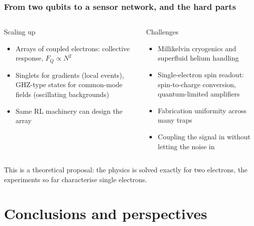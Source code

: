 \documentclass{beamer}
\begin{document}
\begin{frame}
\frametitle{From two qubits to a sensor network, and the hard parts}
\begin{columns}
\begin{block}{Scaling up}
\begin{itemize}
\item Arrays of coupled electrons: collective response, $F_Q\propto N^2$
\item Singlets for gradients (local events), GHZ-type states for common-mode fields (oscillating backgrounds)
\item Same RL machinery can design the array
\end{itemize}
\end{block}
\begin{block}{Challenges}
\begin{itemize}
\item Millikelvin cryogenics and superfluid helium handling
\item Single-electron spin readout: spin-to-charge conversion, quantum-limited amplifiers
\item Fabrication uniformity across many traps
\item Coupling the signal in without letting the noise in
\end{itemize}
\end{block}
\end{columns}
\vspace{2mm}
\begin{block}{}
This is a theoretical proposal: the physics is solved exactly for two electrons, the experiments so far characterise single electrons.
\end{block}
\end{frame}

\section{Conclusions and perspectives}
\end{document}
